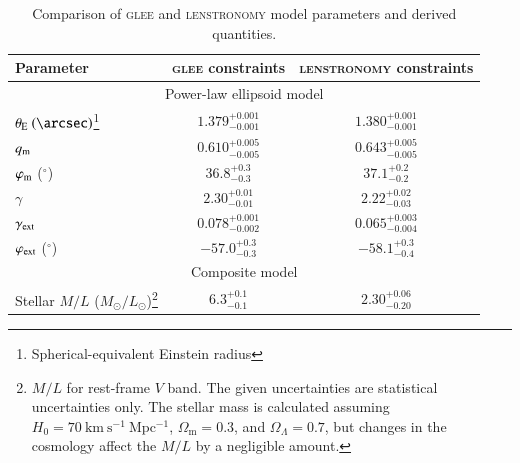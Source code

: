 \documentclass[longauth]{aa}
\begin{document}
\renewcommand*\arraystretch{1.5}
\begin{table}
\caption{Comparison of \textsc{glee} and \textsc{lenstronomy} model parameters and derived quantities.
\label{tab:model_params_comparison}
}
\begin{minipage}{\linewidth}
\begin{tabular}{l|c|c}
\hline
Parameter &
\textsc{glee} constraints &
\textsc{lenstronomy} constraints
\\
\hline
\multicolumn{3}{c}{Power-law ellipsoid model}
\\
\hline
$\theta_{\mathrm{E}}~(\arcsec)$\footnote{Spherical-equivalent Einstein radius} &
$1.379_{-0.001}^{+0.001}$ &
$1.380_{-0.001}^{+0.001}$
\\
$q_{\rm m}$ &
$0.610_{-0.005}^{+0.005}$ &
$0.643_{-0.005}^{+0.005}$ 
\\
$\varphi_{\rm m}$ ($^{\circ}$) &
$36.8_{-0.3}^{+0.3}$ &
$37.1_{- 0.2}^{ + 0.2}$
\\
$\gamma$ &
$2.30_{-0.01}^{+0.01}$ &
$2.22_{-0.03}^{+0.02}$
\\
$\gamma_{\rm ext}$ &
$0.078_{-0.002}^{+0.001}$ &
$0.065_{-0.004}^{+0.003}$
\\
$\varphi_{\rm ext}$ ($^{\circ}$) &
$-57.0_{-0.3}^{+0.3}$ &
$-58.1_{- 0.4}^{+ 0.3}$
\\
\hline
\multicolumn{3}{c}{Composite model}
\\
\hline
Stellar $M/L$ ($M_{\odot}/L_{\odot}$)\footnote{$M/L$ for rest-frame $V$ band. The given uncertainties are statistical uncertainties only. The stellar mass is calculated assuming $H_{0} = 70~\mathrm{km~s^{-1}~Mpc^{-1}}$, $\Omega_{\mathrm{m}} = 0.3$, and $\Omega_{\Lambda} = 0.7$, but changes in the cosmology affect the $M/L$ by a negligible amount.} &
$6.3_{-0.1}^{+0.1}$ &
$2.30_{-0.20}^{+0.06}$
\\

\end{tabular}
\end{minipage}
\end{table}
\end{document}
